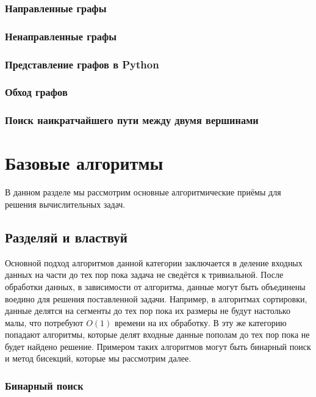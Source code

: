 \subsection{Направленные графы}

\subsection{Ненаправленные графы}

\subsection{Представление графов в Python}

\subsection{Обход графов}

\subsection{Поиск наикратчайшего пути между двумя вершинами}

\chapter{Базовые алгоритмы}

В данном разделе мы рассмотрим основные алгоритмические приёмы 
для решения вычислительных задач. 

\section{Разделяй и властвуй}

Основной подход алгоритмов данной категории заключается 
в деление входных данных на части до тех пор пока задача 
не сведётся к тривиальной. После обработки данных, в 
зависимости от алгоритма, данные могут быть объединены 
воедино для решения поставленной задачи. Например, 
в алгоритмах сортировки, данные делятся на 
сегменты до тех пор пока их размеры не будут 
настолько малы, что потребуют $O(1)$ времени 
на их обработку. В эту же категорию попадают 
алгоритмы, которые делят входные данные пополам
до тех пор пока не будет найдено решение. Примером
таких алгоритмов могут быть бинарный поиск и 
метод бисекций, которые мы рассмотрим далее.

\subsection{Бинарный поиск}

